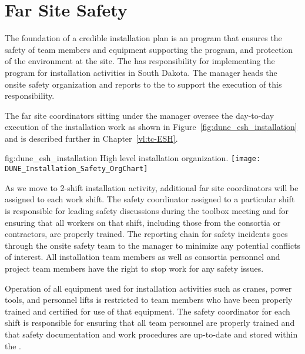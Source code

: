\section{Far Site Safety}
\label{sec:far_site_safety}

The foundation of a credible installation plan is an 
program that ensures the safety of team members and
equipment supporting the program, and protection of the environment at
the  site.  The  has responsibility for
implementing the   program for 
installation activities in South Dakota.  The 
 manager heads the onsite safety organization and reports
to the  to support the execution of this
responsibility.

The far site  coordinators sitting under the
  manager oversee the day-to-day execution
of the installation work as shown in
Figure~\ref{fig:dune_esh_installation} and is described further in
Chapter~\ref{vl:tc-ESH}.
\begin{dunefigure}{fig:dune_esh_installation}
  {High level  installation  organization.}
  \texttt{[image: DUNE\_Installation\_Safety\_OrgChart]}
\end{dunefigure}
As we move to 2-shift installation activity, additional far site  
coordinators will be assigned to each work shift.  The safety coordinator 
assigned to a particular shift is responsible for leading safety discussions 
during the toolbox meeting and for ensuring that all workers on that shift, 
including those from the consortia or contractors, are properly trained.  The 
reporting chain for safety incidents goes through the onsite safety team to 
the   manager to minimize any potential conflicts 
of interest.  All  installation team members as well as  
consortia personnel and  project team members have the right to 
stop work for any safety issues.

Operation of all equipment used for installation activities such as
cranes, power tools, and personnel lifts is restricted to team members
who have been properly trained and certified for use of that
equipment.  The safety coordinator for each shift is responsible for
ensuring that all team personnel are properly trained and that safety
documentation and work procedures are up-to-date and stored within the
.

